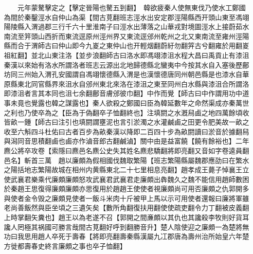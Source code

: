 　　元年蒙驁擊定之【擊定晉陽也驁五到翻】　韓欲疲秦人使無東伐乃使水工鄭國為間於秦鑿涇水自仲山為渠【間古莧翻班志涇水出安定郡涇陽縣西开頭山東至馮翊陽陵縣入渭過郡三行千六十里淮南子曰涇水出薄落之山華戎對境圖涇水上接蔚茹水南流至笄頭山西折而東流逕原州涇州界又東流逕邠州乾州之北又東南流至雍州涇陽縣而合于渭師古曰仲山即今九嵏之東仲山也开輕烟翻蔚紆勿翻笄古兮翻雍於用翻嵏祖紅翻】並北山東注洛【並步浪翻師古曰洛水即馮翊漆沮水程大昌曰禹貢止有漆沮秦漢以來始有洛水所謂洛者班志云源出北地歸德縣北蠻夷中今按其水自入塞後歷鄜坊同三州始入渭孔安國謂自馮翊懷德縣入渭是也漢懷德唐同州朝邑縣是也漆水自華原縣東北同官縣界來沮水自邠州東北來洛在漆沮之東至同州白水縣與漆沮合所謂洛即漆沮者言其本同也沮七余翻鄜音膚邠彼巾翻】中作而覺【師古曰中作謂用功中道事未竟也覺露也韓之謀露也】秦人欲殺之鄭國曰臣為韓延數年之命然渠成亦秦萬世之利也乃使卒為之【臣為于偽翻卒子恤翻終也】注填閼之水漑舄鹵之地四萬餘頃收皆畝一鍾【師古曰注引也填閼謂壅泥也言引淤濁之水灌鹹鹵之田更令肥美故一畝之收至六斛四斗杜佑曰古者百步為畝秦漢以降即二百四十步為畝閼讀曰淤音於據翻舄與潟同音思積翻鹵也鹵亦作滷音郎古翻鹹滷】關中由是益富饒【饒有餘裕也】二年麃公將卒攻卷【索隱曰麃邑名麃公史失其姓名麃悲驕翻將即亮翻又音如字卷逵員翻邑名】斬首三萬　趙以廉頗為假相國伐魏取繁陽【班志繁陽縣屬魏郡應劭曰在繁水之陽括地志繁陽故城在相州内黄縣東北二十七里相息亮翻】趙孝成王薨子悼襄王立使武襄君樂乘代廉頗廉頗怒攻武襄君武襄君走廉頗出犇魏久之魏不能信用趙師數困於秦趙王思復得廉頗廉頗亦思復用於趙趙王使使者視廉頗尚可用否廉頗之仇郭開多與使者金令毁之廉頗見使者一飯斗米肉十斤被甲上馬以示可用使者還報曰廉將軍雖老尚善飯然與臣坐頃之三遺矢矣【數所角翻復扶用翻使使疏吏翻令力丁翻被皮義翻上時掌翻矢糞也】趙王以為老遂不召【郭開之間亷頗以其仇也其讒殺李牧則好貨耳讒人罔極其祸國可勝言哉間古莧翻好呼到翻勝音升】楚人陰使迎之廉頗一為楚將無功曰我思用趙人卒死于壽春【將即亮翻壽秦縣漢屬九冮郡唐為壽州治所始皇六年楚方徙都壽春史終言廉頗之事也卒子恤翻】

